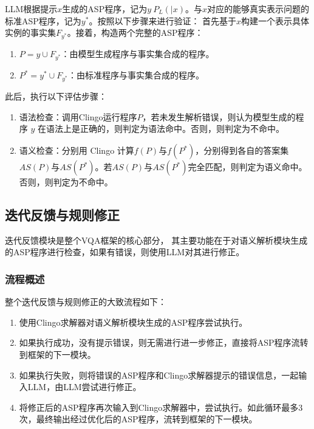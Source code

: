 LLM根据提示$x$生成的ASP程序，记为$y ~ P_L(|x)$。与$x$对应的能够真实表示问题的标准ASP程序，记为$y^*$。按照以下步骤来进行验证：
首先基于$x$构建一个表示具体实例的事实集$F_{y^*}$。接着，构造两个完整的ASP程序：
\begin{enumerate}[nosep]
\item $P = y \cup F_{y^*}$：由模型生成程序与事实集合成的程序。
\item $P^* = y^* \cup F_{y^*}$：由标准程序与事实集合成的程序。
\end{enumerate}

此后，执行以下评估步骤：
\begin{enumerate}
\item 语法检查：调用Clingo运行程序$P$，若未发生解析错误，则认为模型生成的程序 $y$ 在语法上是正确的，则判定为语法命中。否则，则判定为不命中。
\item 语义检查：分别用 Clingo 计算$f(P)$与$f(P^*)$，分别得到各自的答案集$AS(P)$与$AS(P^*)$。若$AS(P)$与$AS(P^*)$完全匹配，则判定为语义命中。
否则，则判定为不命中。
\end{enumerate}
\subsection{迭代反馈与规则修正}
迭代反馈模块是整个VQA框架的核心部分，
其主要功能在于对语义解析模块生成的ASP程序进行检查，如果有错误，则使用LLM对其进行修正。
\subsubsection{流程概述}
整个迭代反馈与规则修正的大致流程如下：
\begin{enumerate}[nosep]
\item 使用Clingo求解器对语义解析模块生成的ASP程序尝试执行。
\item 如果执行成功，没有提示错误，则无需进行进一步修正，直接将ASP程序流转到框架的下一模块。
\item 如果执行失败，则将错误的ASP程序和Clingo求解器提示的错误信息，一起输入LLM，由LLM尝试进行修正。
\item 将修正后的ASP程序再次输入到Clingo求解器中，尝试执行。如此循环最多3次，最终输出经过优化后的ASP程序，流转到框架的下一模块。
\end{enumerate}
